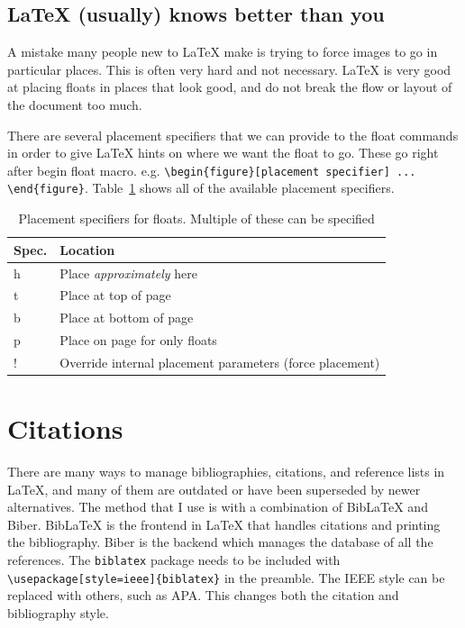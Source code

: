 \documentclass{article}
\begin{document}
\subsection{\LaTeX{} (usually) knows better than you}
A mistake many people new to \LaTeX{} make is trying to force images to go in particular places. This is often very hard and not necessary. \LaTeX{} is very good at placing floats in places that look good, and do not break the flow or layout of the document too much.

There are several placement specifiers that we can provide to the float commands in order to give \LaTeX{} hints on where we want the float to go. These go right after begin float macro. e.g. \lstinline|\begin{figure}[placement specifier] ... \end{figure}|. Table~\ref{tab:placement-specs} shows all of the available placement specifiers.

\begin{table}
    \centering
    \caption{Placement specifiers for floats. Multiple of these can be specified}
    \label{tab:placement-specs}
    \begin{tabular}{ll}
      \toprule
      Spec. & Location \\
      \midrule
      h & Place \emph{approximately} here \\
      t & Place at top of page \\
      b & Place at bottom of page \\
      p & Place on page for only floats \\
      ! & Override internal placement parameters (force placement) \\
      \bottomrule
    \end{tabular}
\end{table}

\section{Citations}
There are many ways to manage bibliographies, citations, and reference lists in \LaTeX{}, and many of them are outdated or have been superseded by newer alternatives. The method that I use is with a combination of BibLaTeX and Biber. BibLaTeX is the frontend in \LaTeX{} that handles citations and printing the bibliography. Biber is the backend which manages the database of all the references. The \lstinline{biblatex} package needs to be included with \lstinline|\usepackage[style=ieee]{biblatex}| in the preamble. The IEEE style can be replaced with others, such as APA. This changes both the citation and bibliography style.
\end{document}
